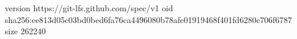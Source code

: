 version https://git-lfs.github.com/spec/v1
oid sha256:ee813d05c03bd0bed6fa76ca4496080b78afe01919468f401fd6280c706f6787
size 262240
